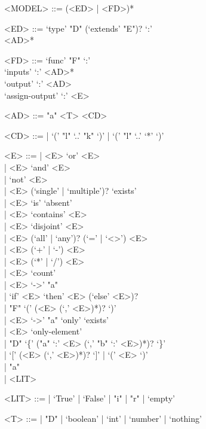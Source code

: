 \begin{grammar}
<MODEL> ::= 
  (<ED> | <FD>)*

<ED> ::= 
  `type' "D" (`extends' "E")? `:'\\
\ind <AD>*

<FD> ::= 
  `func' "F" `:'\\
\ind `inputs' `:' <AD>*\\
\ind `output' `:' <AD>\\
\ind `assign-output' `:' <E>

<AD> ::= 
  "a" <T> <CD>

<CD> ::= 
  | `(' "l" `..' "k" `)' 
  | `(' "l" `..' `*' `)' 

<E> ::= 
  | <E> `or' <E>\\
  | <E> `and' <E>\\
  | `not' <E>\\
  | <E> (`single' | `multiple')? `exists'\\
  | <E> `is' `absent'\\
  | <E> `contains' <E>\\
  | <E> `disjoint' <E>\\
  | <E> (`all' | `any')? (`=' | `<>') <E>\\
  | <E> (`+' | `-') <E>\\
  | <E> (`*' | `/') <E>\\
  | <E> `count'\\
  | <E> `->' "a"\\
  | `if' <E> `then' <E> (`else' <E>)?\\
  | "F" `(' (<E> (`,' <E>)*)? `)'\\
  | <E> `->' "a" `only' `exists'\\
  | <E> `only-element'\\
  | "D" `\{' ("a" `:' <E> (`,' "b" `:' <E>)*)? `\}'\\
  | `[' (<E> (`,' <E>)*)? `]'
  | `(' <E> `)'\\
  | "a"\\
  | <LIT>

<LIT> ::= 
  | `True' | `False' 
  | "i" 
  | "r" 
  | `empty' 

<T> ::= 
  | "D"
  | `boolean'
  | `int'
  | `number'
  | `nothing'
\end{grammar}
